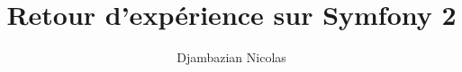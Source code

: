 \documentclass[8pt, francais]{beamer}
\title{Retour d'expérience sur Symfony 2}
\date{}
\author{Djambazian Nicolas}
\begin{document}
\frame{\titlepage}


\end{document}
